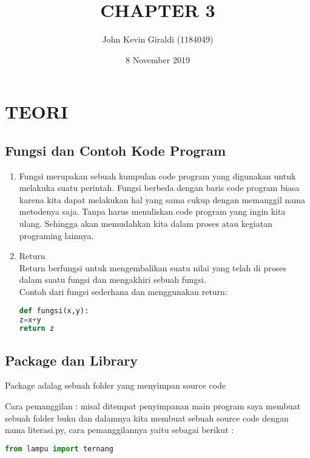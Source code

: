 \documentclass[a4paper, 12pt]{article}
\title{CHAPTER 3}
\author{John Kevin Giraldi (1184049)}
\date{8 November 2019}
\begin{document}
\maketitle

\section{TEORI}
\subsection{Fungsi dan Contoh Kode Program}
\begin{enumerate}
\item Fungsi merupakan sebuah kumpulan code program yang digunakan untuk melakuka suatu perintah. Fungsi berbeda dengan baris code program biasa karena kita dapat melakukan hal yang sama cukup dengan  memanggil nama metodenya saja. Tanpa harus menuliskan code program yang ingin kita ulang. Sehingga akan memudahkan kita dalam proses atau kegiatan programing lainnya.
\item Return \\
Return berfungsi untuk mengembalikan suatu nilai yang telah di proses dalam suatu fungsi dan mengakhiri sebuah fungsi. \\
Contoh dari fungsi sederhana dan menggunakan return:
\begin{lstlisting}[language=Python]
def fungsi(x,y):
z=x+y
return z
\end{lstlisting}
\end{enumerate}
\subsection{Package dan Library}
Package adalag sebuah folder yang menyimpan source code
\item Cara pemanggilan :
 misal ditempat penyimpanan main program saya membuat sebuah folder buku dan dalamnya kita membuat sebuah source code dengan nama literasi.py, cara pemanggilannya yaitu sebagai berikut :
\begin{lstlisting}[language=Python]
from lampu import ternang
\end{lstlisting}
\end{document}
